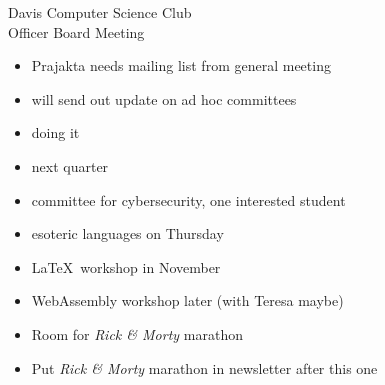 \documentclass{article}
\begin{document}
\begin{Minutes}{Davis Computer Science Club\\Officer Board Meeting}
\begin{itemize}
\item Prajakta needs mailing list from general meeting
\item will send out update on ad hoc committees
\end{itemize}

\begin{itemize}
\item doing it
\item next quarter
\end{itemize}

\begin{itemize}
\item committee for cybersecurity, one interested student
\item esoteric languages on Thursday
\item \LaTeX\ workshop in November
\item WebAssembly workshop later (with Teresa maybe)
\item Room for \textit{Rick \& Morty} marathon
\item Put \textit{Rick \& Morty} marathon in newsletter after this one
\end{itemize}

\thispagestyle{creditfooter}
\end{Minutes}
\end{document}
